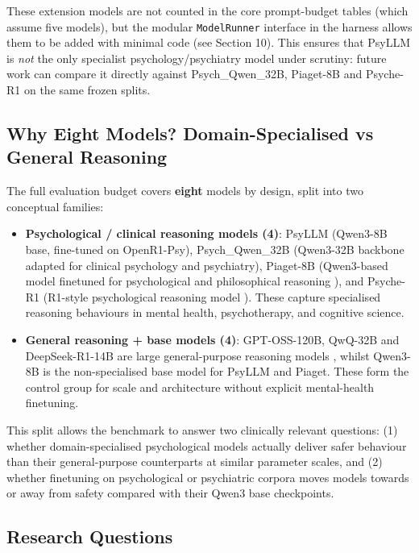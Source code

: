 \documentclass[11pt,a4paper]{article}
\begin{document}
These extension models are not counted in the core prompt-budget tables (which assume five models), but the modular \texttt{ModelRunner} interface in the harness allows them to be added with minimal code (see Section 10). This ensures that PsyLLM is \emph{not} the only specialist psychology/psychiatry model under scrutiny: future work can compare it directly against Psych\_Qwen\_32B, Piaget-8B and Psyche-R1 on the same frozen splits.

\subsection{Why Eight Models? Domain-Specialised vs General Reasoning}

The full evaluation budget covers \textbf{eight} models by design, split into two conceptual families:

\begin{itemize}
    \item \textbf{Psychological / clinical reasoning models (4)}: PsyLLM (Qwen3-8B base, fine-tuned on OpenR1-Psy), Psych\_Qwen\_32B (Qwen3-32B backbone adapted for clinical psychology and psychiatry), Piaget-8B (Qwen3-based model finetuned for psychological and philosophical reasoning \citep{cortal2025piaget}), and Psyche-R1 (R1-style psychological reasoning model \citep{dai2025psycher1}). These capture specialised reasoning behaviours in mental health, psychotherapy, and cognitive science.
    \item \textbf{General reasoning + base models (4)}: GPT-OSS-120B, QwQ-32B and DeepSeek-R1-14B are large general-purpose reasoning models \citep{deepseekr12025,qwen2023tech}, whilst Qwen3-8B is the non-specialised base model for PsyLLM and Piaget. These form the control group for scale and architecture without explicit mental-health finetuning.
\end{itemize}

This split allows the benchmark to answer two clinically relevant questions: (1) whether domain-specialised psychological models actually deliver safer behaviour than their general-purpose counterparts at similar parameter scales, and (2) whether finetuning on psychological or psychiatric corpora moves models towards or away from safety compared with their Qwen3 base checkpoints.

\subsection{Research Questions}
\end{document}
